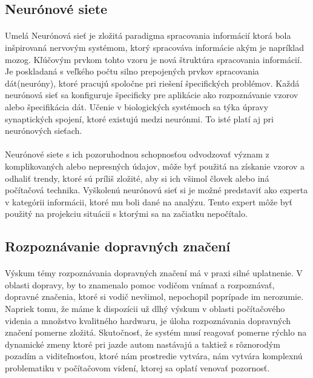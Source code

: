 \documentclass[12pt]{article}
\begin{document}
\subsection{Neurónové siete}
\paragraph{}
Umelá Neurónová sieť je zložitá paradigma spracovania informácií ktorá bola inšpirovaná nervovým systémom, ktorý spracováva informácie akým je napríklad mozog. Kľúčovým prvkom tohto vzoru je nová štruktúra spracovania informácií. Je poskladaná s veľkého počtu silno prepojených prvkov spracovania dát(neuróny), ktoré pracujú spoločne pri riešení špecifických problémov. Každá neurónová sieť sa konfiguruje špecificky pre aplikácie ako rozpoznávanie vzorov alebo špecifikácia dát. Učenie v biologických systémoch sa týka úpravy synaptických spojení, ktoré existujú medzi neurónmi. To isté platí aj pri neurónových sieťach.
\cite{neural_network}
\paragraph{}
Neurónové siete s ich pozoruhodnou schopnosťou odvodzovať význam z komplikovaných alebo nepresných údajov, môže byť použitá na získanie vzorov a odhaliť trendy, ktoré sú príliš zložité, aby si ich všimol človek alebo iná počítačová technika. Vyškolenú neurónovú sieť si je možné predstaviť ako experta v kategórii informácii, ktoré mu boli dané na analýzu. Tento expert môže byť použitý na projekciu situácii s ktorými sa na začiatku nepočítalo. 
\cite{neural_network}
\subsection{Rozpoznávanie dopravných značení}
\paragraph{}
Výskum témy rozpoznávania dopravných značení má v praxi silné uplatnenie. V oblasti dopravy, by to znamenalo pomoc vodičom vnímať a rozpoznávať, dopravné značenia, ktoré si vodič nevšimol, nepochopil poprípade im nerozumie.
Napriek tomu, že máme k dispozícii už dlhý výskum v oblasti počítačového videnia a množstvo kvalitného hardwaru, je úloha rozpoznávania dopravných značení pomerne zložitá.
Skutočnosť, že systém musí reagovať pomerne rýchlo na dynamické zmeny ktoré pri jazde autom nastávajú a taktiež s rôznorodým pozadím a viditeľnosťou, ktoré nám prostredie vytvára,
nám vytvára komplexnú problematiku v počítačovom videní, ktorej sa oplatí venovať pozornosť.\cite{tfs_pdf}
\end{document}
